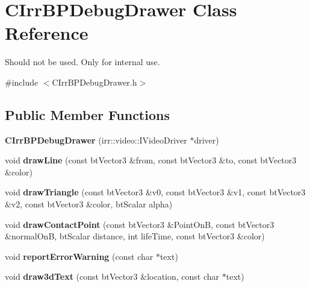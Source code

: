 \hypertarget{class_c_irr_b_p_debug_drawer}{
\section{CIrrBPDebugDrawer Class Reference}
\label{class_c_irr_b_p_debug_drawer}
}


Should not be used. Only for internal use.  




{\ttfamily \#include $<$CIrrBPDebugDrawer.h$>$}

\subsection*{Public Member Functions}
\begin{DoxyCompactItemize}
\item 
\hypertarget{class_c_irr_b_p_debug_drawer_a5b14a017628afd8f1a6e6bcdc6ad6e5d}{
{\bfseries CIrrBPDebugDrawer} (irr::video::IVideoDriver $\ast$driver)}
\label{class_c_irr_b_p_debug_drawer_a5b14a017628afd8f1a6e6bcdc6ad6e5d}

\item 
\hypertarget{class_c_irr_b_p_debug_drawer_a658c524baf35bc7546228e9de858624a}{
void {\bfseries drawLine} (const btVector3 \&from, const btVector3 \&to, const btVector3 \&color)}
\label{class_c_irr_b_p_debug_drawer_a658c524baf35bc7546228e9de858624a}

\item 
\hypertarget{class_c_irr_b_p_debug_drawer_acefdd7e7736d328b811b0b13b1031d20}{
void {\bfseries drawTriangle} (const btVector3 \&v0, const btVector3 \&v1, const btVector3 \&v2, const btVector3 \&color, btScalar alpha)}
\label{class_c_irr_b_p_debug_drawer_acefdd7e7736d328b811b0b13b1031d20}

\item 
\hypertarget{class_c_irr_b_p_debug_drawer_a2b2c18c0eb12653a9a6f01ad65fb73b7}{
void {\bfseries drawContactPoint} (const btVector3 \&PointOnB, const btVector3 \&normalOnB, btScalar distance, int lifeTime, const btVector3 \&color)}
\label{class_c_irr_b_p_debug_drawer_a2b2c18c0eb12653a9a6f01ad65fb73b7}

\item 
\hypertarget{class_c_irr_b_p_debug_drawer_a9084e5b734e0e7ad507c80fe164af765}{
void {\bfseries reportErrorWarning} (const char $\ast$text)}
\label{class_c_irr_b_p_debug_drawer_a9084e5b734e0e7ad507c80fe164af765}

\item 
\hypertarget{class_c_irr_b_p_debug_drawer_a6279d86e4d91611ade0313f5644041ad}{
void {\bfseries draw3dText} (const btVector3 \&location, const char $\ast$text)}
\label{class_c_irr_b_p_debug_drawer_a6279d86e4d91611ade0313f5644041ad}


\end{DoxyCompactItemize}
